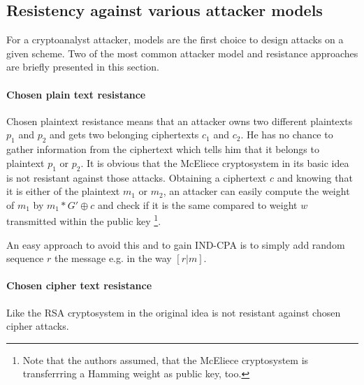 \subsection*{Resistency against various attacker models}
For a cryptoanalyst attacker, models are the first choice to design attacks on a given scheme. Two of the most common attacker model and resistance approaches are briefly presented in this section.

\paragraph*{Chosen plain text resistance}
Chosen plaintext resistance means that an attacker owns two different plaintexts $p_1$ and $p_2$ and gets two belonging ciphertexts $c_1$ and $c_2$. He has no chance to gather information from the ciphertext which tells him that it belongs to plaintext $p_1$ or $p_2$.
It is obvious that the McEliece cryptosystem in its basic idea is not resistant against those attacks. Obtaining a ciphertext $c$ and knowing that it is either of the plaintext $m_1$ or $m_2$, an attacker can easily compute the weight of $m_1$ by $m_1 * G' \oplus c $ and check if it is the same compared to weight $w$ transmitted within  the public key \footnote{Note that the authors assumed, that the McEliece cryptosystem is transferrring a Hamming weight as public key, too.}.

An easy approach to avoid this and to gain IND-CPA is to simply add random sequence $r$  the message e.g. in the way $[r|m]$. \cite{nojima2008semantic}
\paragraph*{Chosen cipher text resistance}
Like the RSA cryptosystem in the original idea is not resistant against chosen cipher attacks. 

